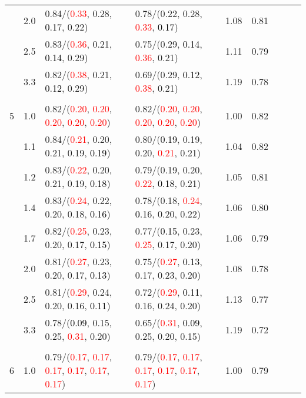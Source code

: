 \documentclass[10pt,a4paper]{report}
\begin{document}
\begin{table}[!htbp]
\begin{center}
{\begin{tabular}{ccllccccc}
			&2.0&0.84/(\textcolor{red}{0.33}, 0.28, \textcolor{black}{0.17}, 0.22)&0.78/(0.22, 0.28, \textcolor{red}{0.33}, \textcolor{black}{0.17})&1.08&0.81\\
			&2.5&0.83/(\textcolor{red}{0.36}, 0.21, \textcolor{black}{0.14}, 0.29)&0.75/(0.29, \textcolor{black}{0.14}, \textcolor{red}{0.36}, 0.21)&1.11&0.79\\
			&3.3&0.82/(\textcolor{red}{0.38}, 0.21, \textcolor{black}{0.12}, 0.29)&0.69/(0.29, \textcolor{black}{0.12}, \textcolor{red}{0.38}, 0.21)&1.19&0.78\\
			&&&&\\
			5			&1.0&0.82/(\textcolor{red}{0.20}, \textcolor{red}{0.20}, \textcolor{red}{0.20}, \textcolor{red}{0.20}, \textcolor{red}{0.20})&0.82/(\textcolor{red}{0.20}, \textcolor{red}{0.20}, \textcolor{red}{0.20}, \textcolor{red}{0.20}, \textcolor{red}{0.20})&1.00&0.82\\
			&1.1&0.84/(\textcolor{red}{0.21}, 0.20, 0.21, 0.19, \textcolor{black}{0.19})&0.80/(\textcolor{black}{0.19}, 0.19, 0.20, \textcolor{red}{0.21}, 0.21)&1.04&0.82\\
			&1.2&0.83/(\textcolor{red}{0.22}, 0.20, 0.21, 0.19, \textcolor{black}{0.18})&0.79/(0.19, 0.20, \textcolor{red}{0.22}, \textcolor{black}{0.18}, 0.21)&1.05&0.81\\
			&1.4&0.83/(\textcolor{red}{0.24}, 0.22, 0.20, 0.18, \textcolor{black}{0.16})&0.78/(0.18, \textcolor{red}{0.24}, \textcolor{black}{0.16}, 0.20, 0.22)&1.06&0.80\\
			&1.7&0.82/(\textcolor{red}{0.25}, 0.23, 0.20, 0.17, \textcolor{black}{0.15})&0.77/(\textcolor{black}{0.15}, 0.23, \textcolor{red}{0.25}, 0.17, 0.20)&1.06&0.79\\
			&2.0&0.81/(\textcolor{red}{0.27}, 0.23, 0.20, 0.17, \textcolor{black}{0.13})&0.75/(\textcolor{red}{0.27}, \textcolor{black}{0.13}, 0.17, 0.23, 0.20)&1.08&0.78\\
			&2.5&0.81/(\textcolor{red}{0.29}, 0.24, 0.20, 0.16, \textcolor{black}{0.11})&0.72/(\textcolor{red}{0.29}, \textcolor{black}{0.11}, 0.16, 0.24, 0.20)&1.13&0.77\\
			&3.3&0.78/(\textcolor{black}{0.09}, 0.15, 0.25, \textcolor{red}{0.31}, 0.20)&0.65/(\textcolor{red}{0.31}, \textcolor{black}{0.09}, 0.25, 0.20, 0.15)&1.19&0.72\\
			&&&&\\
			6			&1.0&0.79/(\textcolor{red}{0.17}, \textcolor{red}{0.17}, \textcolor{red}{0.17}, \textcolor{red}{0.17}, \textcolor{red}{0.17}, \textcolor{red}{0.17})&0.79/(\textcolor{red}{0.17}, \textcolor{red}{0.17}, \textcolor{red}{0.17}, \textcolor{red}{0.17}, \textcolor{red}{0.17}, \textcolor{red}{0.17})&1.00&0.79\\

\end{tabular}}
\end{center}
\end{table}
\end{document}
